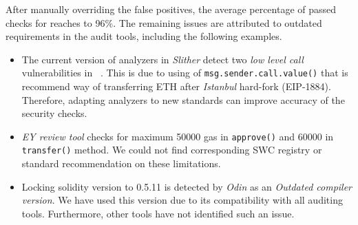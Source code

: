 After manually overriding the false positives, the average percentage of passed checks for \sys reaches to 96\%. The remaining issues are attributed to outdated requirements in the audit tools, including the following examples.

\begin{itemize}
	\item The current version of analyzers in \textit{Slither} detect two \textit{low level call} vulnerabilities in \sys~\cite{SlitherSetup}. This is due to using of \texttt{msg.sender.call.value()} that is recommend way of transferring ETH after \textit{Istanbul} hard-fork (EIP-1884).	Therefore, adapting analyzers to new standards can improve accuracy of the security checks.
	\item \textit{EY review tool} checks for maximum 50000 gas in \texttt{approve()} and 60000 in \texttt{transfer()} method. We could not find corresponding SWC registry or standard recommendation on these limitations.
	\item Locking solidity version to 0.5.11 is detected by \textit{Odin} as an \textit{Outdated compiler version}. We have used this version due to its compatibility with all auditing tools. Furthermore, other tools have not identified such an issue.
\end{itemize}


